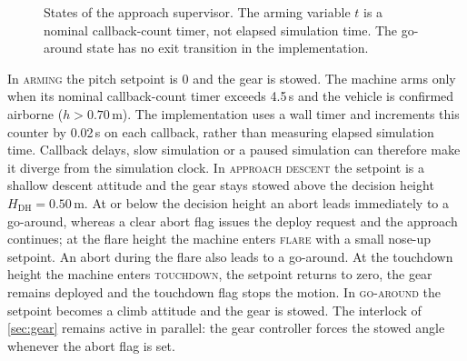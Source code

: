 \documentclass[11pt,a4paper]{article}
\begin{document}
\begin{figure}[ht]
\centering
{}
\caption{States of the approach supervisor. The arming variable $t$ is a nominal callback-count timer, not elapsed simulation time. The go-around state has no exit transition in the implementation.}
\label{fig:flightfsm}
\end{figure}

\noindent
In \textsc{arming} the pitch setpoint is $0$ and the gear is stowed. The machine arms only when its nominal callback-count timer exceeds 4.5\,s and the vehicle is confirmed airborne ($h>0.70$\,m). The implementation uses a wall timer and increments this counter by 0.02\,s on each callback, rather than measuring elapsed simulation time. Callback delays, slow simulation or a paused simulation can therefore make it diverge from the simulation clock. In \textsc{approach descent} the setpoint is a shallow descent attitude and the gear stays stowed above the decision height $H_{\mathrm{DH}}=0.50$\,m. At or below the decision height an abort leads immediately to a go-around, whereas a clear abort flag issues the deploy request and the approach continues; at the flare height the machine enters \textsc{flare} with a small nose-up setpoint. An abort during the flare also leads to a go-around. At the touchdown height the machine enters \textsc{touchdown}, the setpoint returns to zero, the gear remains deployed and the touchdown flag stops the motion. In \textsc{go-around} the setpoint becomes a climb attitude and the gear is stowed. The interlock of \cref{sec:gear} remains active in parallel: the gear controller forces the stowed angle whenever the abort flag is set.
 
\end{document}
